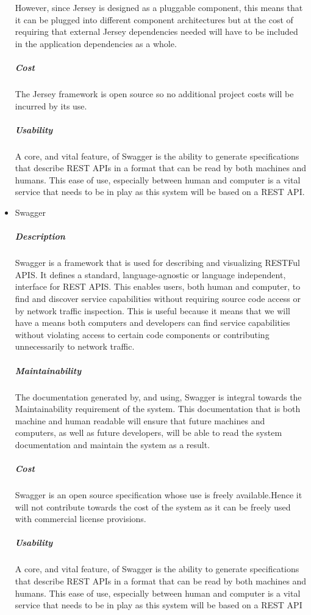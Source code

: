 \documentclass[a4paper,10pt]{article}
\begin{document}
\begin{itemize}
			However, since Jersey is designed as a pluggable component, this means that it can be plugged into different component architectures but at the cost of requiring that external Jersey dependencies needed will have to be included in the application dependencies as a whole.
			\subparagraph{Cost}
			The Jersey framework is open source so no additional project costs will be incurred by its use.
			\subparagraph{Usability}
			A core, and vital feature, of Swagger is the ability to generate specifications that describe REST APIs in a format that can be read by both machines and humans. This ease of use, especially between human and computer is a vital service that needs to be in play as this system will be based on a REST API.		
		\item Swagger
			\subparagraph{Description}
			Swagger is a framework that is used for describing and visualizing RESTFul APIS. It defines a standard, language-agnostic or language independent, interface for REST APIS. This enables users, both human and computer, to find and discover service capabilities without requiring source code access or by network traffic inspection. This is useful because it means that we will have a means both computers and developers can find service capabilities without violating access to certain code components or contributing unnecessarily to network traffic.
			\subparagraph{Maintainability}
			The documentation generated by, and using, Swagger is integral towards the Maintainability requirement of the system. This documentation that is both machine and human readable will ensure that future machines and computers, as well as future developers, will be able to read the system documentation and maintain the system as a result.
			\subparagraph{Cost}
			Swagger is an open source specification  whose use is freely available.Hence it will not contribute towards the cost of the system as it can be freely used with commercial license provisions.
			\subparagraph{Usability}
			A core, and vital feature, of Swagger is the ability to generate specifications that describe REST APIs in a format that can be read by both machines and humans. This ease of use, especially between human and computer is a vital service that needs to be in play as this system will be based on a REST API
	\end{itemize}
\end{document}

